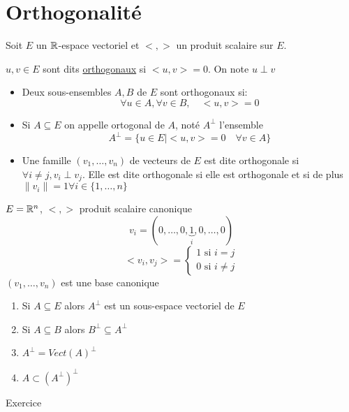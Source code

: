 \documentclass[a4paper]{report}
\begin{document}
\section{Orthogonalité}
Soit $E$ un  $\mathbb{R}$-espace vectoriel et  $< , >$ un produit scalaire sur  $E$.
 \begin{definition}
     $u, v \in E$ sont dits \underline{orthogonaux} si  $<u, v> = 0$. On note  $u \perp v$
      \begin{itemize}
         \item Deux sous-ensembles $A, B$ de  $E$ sont orthogonaux si:
              \[
             \forall u \in A, \forall v \in B, \quad <u, v> = 0
             \] 
         \item Si $A \subseteq E$ on appelle ortogonal de $A$, noté  $A^{\perp}$ l'ensemble
              \[
                  A^{\perp} = \{ u \in E \mid <u, v> = 0 \quad \forall v \in A \}
             \] 
         \item Une famille $(v_1, \ldots, v_n)$ de vecteurs de $E$ est dite orthogonale si  $\forall i \neq j, v_i \perp v_j$. Elle est dite orthogonale si elle est orthogonale et si de plus $\|v_i\| = 1 \forall i \in \{ 1, \ldots, n \}$
     \end{itemize}
\end{definition}
\begin{eg}
   $E = \mathbb{R}^n$,  $< , >$ produit scalaire canonique 
   \[
       v_i = (0, \ldots, 0, \underbrace{1}_{i}, 0, \ldots, 0)
   \] 
   \[
   <v_i, v_j> = \begin{cases}
       1 \text{ si } i = j\\  
       0 \text{ si } i \neq  j
   \end{cases}
   \] 
   $(v_1, \ldots, v_n)$ est une base canonique
\end{eg}
\begin{prop}
    \begin{enumerate}
        \item 
            Si $A \subseteq E$ alors $A^{\perp}$ est un sous-espace vectoriel de  $E$ 
        \item Si $A \subseteq B$ alors $B^{\perp} \subseteq A^{\perp}$
        \item $A^{\perp} = Vect(A)^{\perp}$
        \item $A \subset (A^{\perp})^{\perp}$ 
    \end{enumerate}
\end{prop}
\begin{explanation}
   Exercice 
\end{explanation}
\end{document}
